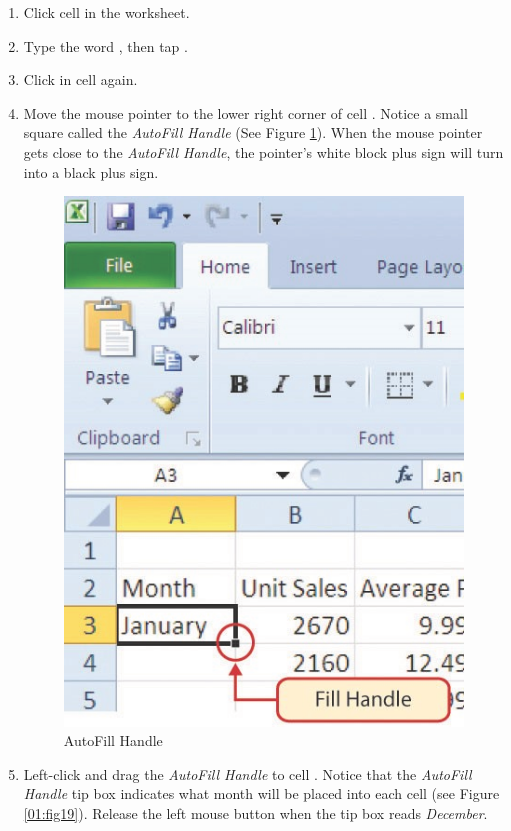\begin{enumbox}
	\begin{enumerate}
		\item Click cell  in the  worksheet.
		\item Type the word , then tap .
		\item Click in cell  again.
		\item Move the mouse pointer to the lower right corner of cell . Notice a small square called the \textit{AutoFill Handle} (See Figure \ref{01:fig18}). When the mouse pointer gets close to the \textit{AutoFill Handle}, the pointer's white block plus sign will turn into a black plus sign.

		\begin{figure}[H]
			\centering
			\includegraphics[width=\maxwidth{.75\linewidth}]{gfx/ch01_fig18}
			\caption{AutoFill Handle}
			\label{01:fig18}
		\end{figure}

		\item Left-click and drag the \textit{AutoFill Handle} to cell . Notice that the \textit{AutoFill Handle} tip box indicates what month will be placed into each cell (see Figure \ref{01:fig19}). Release the left mouse button when the tip box reads \textit{December}.
	\end{enumerate}
\end{enumbox}
	
